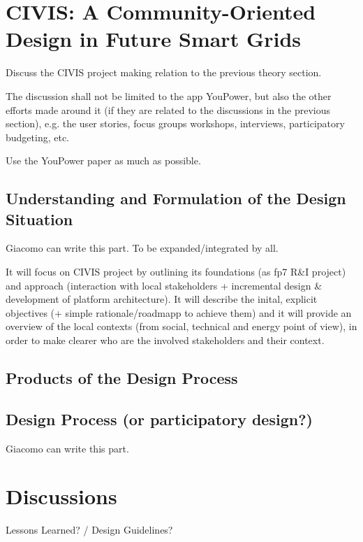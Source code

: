 \section{CIVIS: A Community-Oriented Design in Future Smart Grids}

\begin{svgraybox}
Discuss the CIVIS project making relation to the previous theory section. 

The discussion shall not be limited to the app YouPower, but also the other efforts made around it (if they are related to the discussions in the previous section), e.g. the user stories, focus groups workshops, interviews, participatory budgeting, etc. 

Use the YouPower paper as much as possible. 
\end{svgraybox}

\subsection{Understanding and Formulation of the Design Situation}
\begin{svgraybox}
[note by GP] Giacomo can write this part. To be expanded/integrated by all.

It will focus on CIVIS project by outlining its foundations (as fp7 R\&I project) and approach (interaction with local stakeholders + incremental design \& development of platform architecture). It will describe the inital, explicit objectives (+ simple rationale/roadmapp to achieve them) and it will provide an overview of the local contexts (from social, technical and energy point of view), in order to make clearer who are the involved stakeholders and their context.
\end{svgraybox}

\subsection{Products of the Design Process}

\subsection{Design Process (or participatory design?)}

\begin{svgraybox}
[note by GP] Giacomo can write this part. 

\end{svgraybox}


\section{Discussions}

\begin{svgraybox}
Lessons Learned?  / Design Guidelines? 
\end{svgraybox}